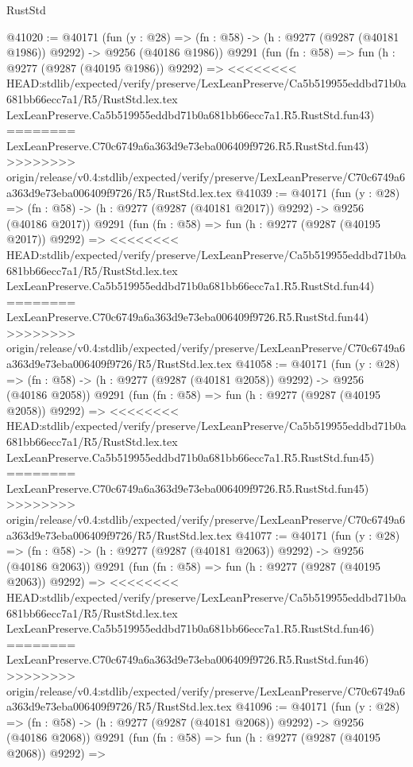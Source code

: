 \begin{lexlean}{RustStd}
\begin{coremodule}
{\begin{coremodule}
{{{{{{{{{{{{{{{{{{{{{{{{{{{{{{{{{{{{{{{{{{{{{{{{{{{{{{{@41020 := @40171
    (fun (y : @28) =>
    (fn : @58) -> (h : @9277 (@9287 (@40181 @1986)) @9292) -> @9256 (@40186 @1986))
    @9291
    (fun (fn : @58) =>
    fun (h : @9277 (@9287 (@40195 @1986)) @9292) =>
<<<<<<<< HEAD:stdlib/expected/verify/preserve/LexLeanPreserve/Ca5b519955eddbd71b0a681bb66ecc7a1/R5/RustStd.lex.tex
    LexLeanPreserve.Ca5b519955eddbd71b0a681bb66ecc7a1.R5.RustStd.fun43)
========
    LexLeanPreserve.C70c6749a6a363d9e73eba006409f9726.R5.RustStd.fun43)
>>>>>>>> origin/release/v0.4:stdlib/expected/verify/preserve/LexLeanPreserve/C70c6749a6a363d9e73eba006409f9726/R5/RustStd.lex.tex
@41039 := @40171
    (fun (y : @28) =>
    (fn : @58) -> (h : @9277 (@9287 (@40181 @2017)) @9292) -> @9256 (@40186 @2017))
    @9291
    (fun (fn : @58) =>
    fun (h : @9277 (@9287 (@40195 @2017)) @9292) =>
<<<<<<<< HEAD:stdlib/expected/verify/preserve/LexLeanPreserve/Ca5b519955eddbd71b0a681bb66ecc7a1/R5/RustStd.lex.tex
    LexLeanPreserve.Ca5b519955eddbd71b0a681bb66ecc7a1.R5.RustStd.fun44)
========
    LexLeanPreserve.C70c6749a6a363d9e73eba006409f9726.R5.RustStd.fun44)
>>>>>>>> origin/release/v0.4:stdlib/expected/verify/preserve/LexLeanPreserve/C70c6749a6a363d9e73eba006409f9726/R5/RustStd.lex.tex
@41058 := @40171
    (fun (y : @28) =>
    (fn : @58) -> (h : @9277 (@9287 (@40181 @2058)) @9292) -> @9256 (@40186 @2058))
    @9291
    (fun (fn : @58) =>
    fun (h : @9277 (@9287 (@40195 @2058)) @9292) =>
<<<<<<<< HEAD:stdlib/expected/verify/preserve/LexLeanPreserve/Ca5b519955eddbd71b0a681bb66ecc7a1/R5/RustStd.lex.tex
    LexLeanPreserve.Ca5b519955eddbd71b0a681bb66ecc7a1.R5.RustStd.fun45)
========
    LexLeanPreserve.C70c6749a6a363d9e73eba006409f9726.R5.RustStd.fun45)
>>>>>>>> origin/release/v0.4:stdlib/expected/verify/preserve/LexLeanPreserve/C70c6749a6a363d9e73eba006409f9726/R5/RustStd.lex.tex
@41077 := @40171
    (fun (y : @28) =>
    (fn : @58) -> (h : @9277 (@9287 (@40181 @2063)) @9292) -> @9256 (@40186 @2063))
    @9291
    (fun (fn : @58) =>
    fun (h : @9277 (@9287 (@40195 @2063)) @9292) =>
<<<<<<<< HEAD:stdlib/expected/verify/preserve/LexLeanPreserve/Ca5b519955eddbd71b0a681bb66ecc7a1/R5/RustStd.lex.tex
    LexLeanPreserve.Ca5b519955eddbd71b0a681bb66ecc7a1.R5.RustStd.fun46)
========
    LexLeanPreserve.C70c6749a6a363d9e73eba006409f9726.R5.RustStd.fun46)
>>>>>>>> origin/release/v0.4:stdlib/expected/verify/preserve/LexLeanPreserve/C70c6749a6a363d9e73eba006409f9726/R5/RustStd.lex.tex
@41096 := @40171
    (fun (y : @28) =>
    (fn : @58) -> (h : @9277 (@9287 (@40181 @2068)) @9292) -> @9256 (@40186 @2068))
    @9291
    (fun (fn : @58) =>
    fun (h : @9277 (@9287 (@40195 @2068)) @9292) =>
}}}}}}}}}}}}}}}}}}}}}}}}}}}}}}}}}}}}}}}}}}}}}}}}}}}}}}}
\end{coremodule}}
\end{coremodule}
\end{lexlean}
